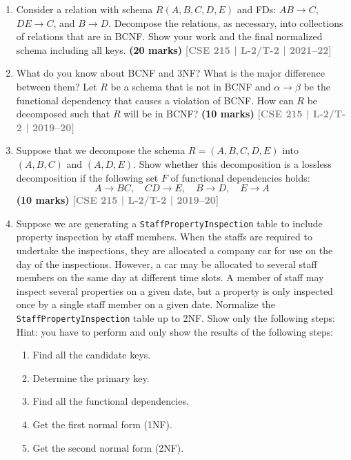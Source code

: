 \documentclass[12pt]{article}
\newcommand{\yr}[1]{\hfill\textcolor{gray}{\small\textbf{[#1]}}}
\newcommand{\mk}[1]{\textcolor{orange!70!black}{\small\textbf{(#1 marks)}}}
\begin{document}
\begin{enumerate}
\item Consider a relation with schema $R(A, B, C, D, E)$ and FDs: $AB \to C$, $DE \to C$, and $B \to D$. Decompose the relations, as necessary, into collections of relations that are in BCNF. Show your work and the final normalized schema including all keys.
\mk{20} \yr{CSE 215 | L-2/T-2 | 2021--22}



\item What do you know about BCNF and 3NF? What is the major difference between them? Let $R$ be a schema that is not in BCNF and $\alpha \to \beta$ be the functional dependency that causes a violation of BCNF. How can $R$ be decomposed such that $R$ will be in BCNF?
\mk{10} \yr{CSE 215 | L-2/T-2 | 2019--20}


\item Suppose that we decompose the schema $R = (A, B, C, D, E)$ into $(A, B, C)$ and $(A, D, E)$. Show whether this decomposition is a lossless decomposition if the following set $F$ of functional dependencies holds:
\[A \to BC,\quad CD \to E,\quad B \to D,\quad E \to A\]
\mk{10} \yr{CSE 215 | L-2/T-2 | 2019--20}



\item Suppose we are generating a \texttt{StaffPropertyInspection} table to include property inspection
by staff members. When the staffs are required to undertake the inspections, they are
allocated a company car for use on the day of the inspections. However, a car may be allocated
to several staff members on the same day at different time slots. A member of staff
may inspect several properties on a given date, but a property is only inspected once by a
single staff member on a given date.
Normalize the \texttt{StaffPropertyInspection} table up to 2NF. Show only the following steps:\\
Hint: you have to perform and only show the results of the following steps:
\begin{enumerate}
  \item Find all the candidate keys.
  \item Determine the primary key.
  \item Find all the functional dependencies.
  \item Get the first normal form (1NF).
  \item Get the second normal form (2NF).
\end{enumerate}


\end{enumerate}
\end{document}
